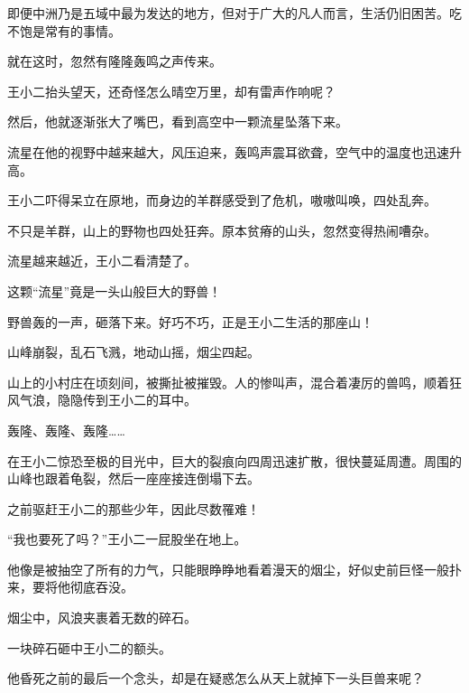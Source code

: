 \begin{this_body}
即便中洲乃是五域中最为发达的地方，但对于广大的凡人而言，生活仍旧困苦。吃不饱是常有的事情。

就在这时，忽然有隆隆轰鸣之声传来。

王小二抬头望天，还奇怪怎么晴空万里，却有雷声作响呢？

然后，他就逐渐张大了嘴巴，看到高空中一颗流星坠落下来。

流星在他的视野中越来越大，风压迫来，轰鸣声震耳欲聋，空气中的温度也迅速升高。

王小二吓得呆立在原地，而身边的羊群感受到了危机，嗷嗷叫唤，四处乱奔。

不只是羊群，山上的野物也四处狂奔。原本贫瘠的山头，忽然变得热闹嘈杂。

流星越来越近，王小二看清楚了。

这颗“流星”竟是一头山般巨大的野兽！

野兽轰的一声，砸落下来。好巧不巧，正是王小二生活的那座山！

山峰崩裂，乱石飞溅，地动山摇，烟尘四起。

山上的小村庄在顷刻间，被撕扯被摧毁。人的惨叫声，混合着凄厉的兽鸣，顺着狂风气浪，隐隐传到王小二的耳中。

轰隆、轰隆、轰隆……

在王小二惊恐至极的目光中，巨大的裂痕向四周迅速扩散，很快蔓延周遭。周围的山峰也跟着龟裂，然后一座座接连倒塌下去。

之前驱赶王小二的那些少年，因此尽数罹难！

“我也要死了吗？”王小二一屁股坐在地上。

他像是被抽空了所有的力气，只能眼睁睁地看着漫天的烟尘，好似史前巨怪一般扑来，要将他彻底吞没。

烟尘中，风浪夹裹着无数的碎石。

一块碎石砸中王小二的额头。

他昏死之前的最后一个念头，却是在疑惑怎么从天上就掉下一头巨兽来呢？

\end{this_body}

